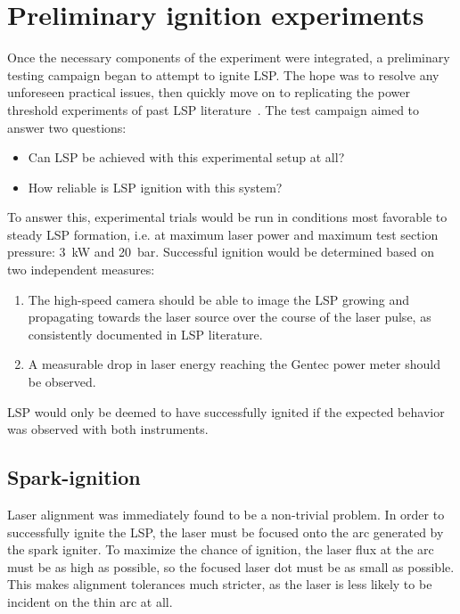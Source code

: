     \section{Preliminary ignition experiments} \label{sec:ignitiontest}
        Once the necessary components of the experiment were integrated, a preliminary testing campaign began to attempt to ignite LSP. The hope was to resolve any unforeseen practical issues, then quickly move on to replicating the power threshold experiments of past LSP literature~\cite{zimakovInteractionNearIRLaser2016,matsuiGeneratingConditionsArgon2019,luCharacteristicDiagnosticsLaserStabilized2022}. The test campaign aimed to answer two questions:
        \begin{itemize}
            \item Can LSP be achieved with this experimental setup at all?
            \item How reliable is LSP ignition with this system?
        \end{itemize}
        To answer this, experimental trials would be run in conditions most favorable to steady LSP formation, i.e. at maximum laser power and maximum test section pressure: \qty{3}{kW} and \qty{20}{bar}. Successful ignition would be determined based on two independent measures:
        \begin{enumerate}
            \item The high-speed camera should be able to image the LSP growing and propagating towards the laser source over the course of the laser pulse, as consistently documented in LSP literature.
            \item A measurable drop in laser energy reaching the Gentec power meter should be observed.
        \end{enumerate}
        LSP would only be deemed to have successfully ignited if the expected behavior was observed with both instruments.

        \subsection{Spark-ignition}
            Laser alignment was immediately found to be a non-trivial problem. In order to successfully ignite the LSP, the laser must be focused onto the arc generated by the spark igniter. To maximize the chance of ignition, the laser flux at the arc must be as high as possible, so the focused laser dot must be as small as possible. This makes alignment tolerances much stricter, as the laser is less likely to be incident on the thin arc at all.

